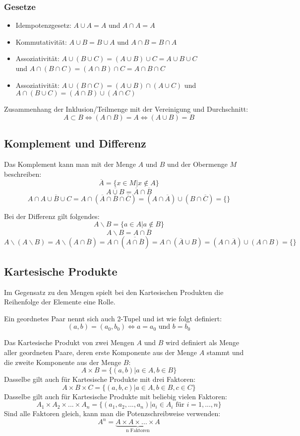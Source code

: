\subsubsection{Gesetze}
\begin{itemize}
  \item Idempotenzgesetz: $A \cup A = A$ und $A \cap A = A$
  \item Kommutativität: $A \cup B = B \cup A$ und $A \cap B = B \cap A$
  \item Assoziativität: $A \cup (B \cup C) = (A \cup B) \cup C = A \cup
  B \cup C$ \\ und $A \cap (B \cap C) = (A \cap B) \cap C = A \cap B \cap C$
  \item Assoziativität: $A \cup (B \cap C) = (A \cup B) \cap (A \cup C)$
    und $A \cap (B \cup C) = (A \cap B) \cup (A \cap C)$
\end{itemize}
Zusammenhang der Inklusion/Teilmenge mit der Vereinigung und Durchschnitt:
\[ A \subset B \Leftrightarrow (A \cap B) = A \Leftrightarrow (A \cup B)
= B \]

\subsection{Komplement und Differenz}
Das Komplement kann man mit der Menge $A$ und $B$ und der Obermenge $M$
beschreiben:
\[\overline A = \{ x \in M | x \notin A\} \]
\[ \overline{A \cup B} = \overline A \cap \overline B \]
\[ A \cap \overline{A \cup B \cup C} = A \cap (\overline A \cap
  \overline B \cap \overline C) = (A \cap \overline A) \cup (B \cap
  \overline C) = \{\}\]

Bei der Differenz gilt folgendes:
\[ A \backslash B = \{ a \in A | a \notin B \}\]
\[ A \backslash B = A \cap \overline B \]
\[ A \backslash (A \backslash B) = A \backslash (A \cap \overline B) = A
  \cap (\overline{A \cap \overline B}) = A \cap (\overline A \cup B) = (A
  \cap \overline A) \cup (A \cap B) = \{\}\]

\subsection{Kartesische Produkte}
Im Gegensatz zu den Mengen spielt bei den Kartesischen Produkten die
Reihenfolge der Elemente eine Rolle.

Ein geordnetes Paar nennt sich auch 2-Tupel und ist wie folgt definiert:
\[ (a, b) = (a_0, b_0) \Leftrightarrow a = a_0 \text{ und } b = b_0 \]

Das Kartesische Produkt von zwei Mengen $A$ und $B$ wird definiert als
Menge aller geordneten Paare, deren erste Komponente aus der Menge $A$
stammt und die zweite Komponente aus der Menge $B$:
\[ A \times B = \{(a,b)|a \in A, b \in B \}\]
Dasselbe gilt auch für Kartesische Produkte mit drei Faktoren:
\[ A \times B \times C = \{(a,b,c)|a \in A, b \in B, c \in C \}\]
Dasselbe gilt auch für Kartesische Produkte mit beliebig vielen Faktoren:
\[ A_1 \times A_2 \times ... \times A_n = \{(a_1,a_2,...,a_n)|a_i \in
A_i \text{ für } i = 1, ..., n \}\]
Sind alle Faktoren gleich, kann man die Potenzschreibweise verwenden:
\[ A^n = \underbrace{A \times A \times ... \times A}_{\text{n Faktoren}} \]

